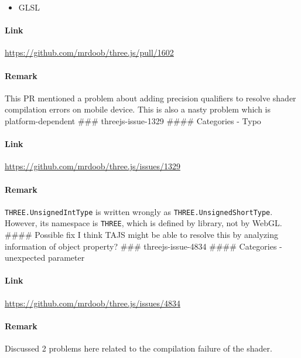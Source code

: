 \begin{itemize}
\tightlist
\item
  GLSL
\end{itemize}

\paragraph{Link}\label{link}

\url{https://github.com/mrdoob/three.js/pull/1602}

\paragraph{Remark}\label{remark}

This PR mentioned a problem about adding precision qualifiers to resolve
shader compilation errors on mobile device. This is also a nasty problem
which is platform-dependent \#\#\# threejs-issue-1329 \#\#\#\#
Categories - Typo

\paragraph{Link}\label{link-1}

\url{https://github.com/mrdoob/three.js/issues/1329}

\paragraph{Remark}\label{remark-1}

\texttt{THREE.UnsignedIntType} is written wrongly as
\texttt{THREE.UnsignedShortType}. However, its namespace is
\texttt{THREE}, which is defined by library, not by WebGL. \#\#\#\#
Possible fix I think TAJS might be able to resolve this by analyzing
information of object property? \#\#\# threejs-issue-4834 \#\#\#\#
Categories - unexpected parameter

\paragraph{Link}\label{link-2}

\url{https://github.com/mrdoob/three.js/issues/4834}

\paragraph{Remark}\label{remark-2}

Discussed 2 problems here related to the compilation failure of the
shader.

